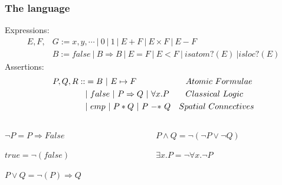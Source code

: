 \documentclass{beamer}
\begin{document}
    \begin{frame}
        \frametitle{The language}
        
        Expressions:
        \begin{equation*}
            \begin{split}
            E,F,&G := x,y,\cdots\ |\ 0\ |\ 1\ |\ E + F\ |\ E \times F\ |\ E - F \\
            &B := false\ |\ B \Rightarrow B\ |\ E=F\ |\ E<F\ |\ isatom?(E)\ | isloc?(E)
            \end{split}
        \end{equation*}
    \pause
    Assertions:
     \begin{equation*}
        \begin{split}
        P,Q,R ::&= B\ |\ E \mapsto F \hspace{21mm}Atomic\ Formulae \\
            &|\ false\ |\ P \Rightarrow Q\ |\ \forall x.P \hspace{7mm}Classical\ Logic \\
            &|\ emp\  |\ P * Q\ |\ P\ {-*}\ Q \quad Spatial\ Connectives
        \end{split}      
     \end{equation*}
     
     \begin{columns}
         \begin{column}{.5\textwidth}
             \pause
             $\neg P = P \Rightarrow False$
             
             
             $true = \neg(false)$
             
             
             $P \vee Q = \neg(P) \Rightarrow Q$  
         \end{column}
         \begin{column}{.5\textwidth}
             \pause
             $P \wedge Q = \neg(\neg P \vee \neg Q)$

             $\exists x.P = \neg\forall x.\neg P$
         \end{column}
     \end{columns}
    \end{frame}
\end{document}
